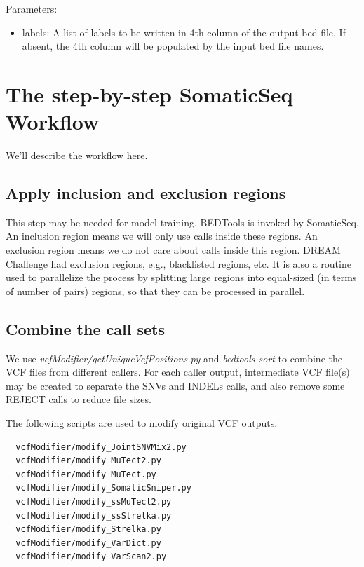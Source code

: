 \documentclass[10pt,letterpaper]{article}
\begin{document}
\begin{sloppypar}
\begin{lstlisting}
\end{lstlisting}

Parameters:

\begin{itemize}

\item labels: A list of labels to be written in 4th column of the output bed file. If absent, the 4th column will be populated by the input bed file names.

\end{itemize}




\section{The step-by-step SomaticSeq Workflow} \label{step_by_step_procedures}

We'll describe the workflow here.

\subsection{Apply inclusion and exclusion regions}

This step may be needed for model training. BEDTools is invoked by SomaticSeq. An inclusion region means we will only use calls inside these regions. An exclusion region means we do not care about calls inside this region. DREAM Challenge had exclusion regions, e.g., blacklisted regions, etc. It is also a routine used to parallelize the process by splitting large regions into equal-sized (in terms of number of pairs) regions, so that they can be processed in parallel.  



\subsection{Combine the call sets}
We use \textit{vcfModifier/getUniqueVcfPositions.py} and \textit{bedtools sort} to combine the VCF files from different callers. For each caller output, intermediate VCF file(s) may be created to separate the SNVs and INDELs calls, and also remove some REJECT calls to reduce file sizes.

The following scripts are used to modify original VCF outputs.


\begin{lstlisting}
  vcfModifier/modify_JointSNVMix2.py
  vcfModifier/modify_MuTect2.py
  vcfModifier/modify_MuTect.py
  vcfModifier/modify_SomaticSniper.py
  vcfModifier/modify_ssMuTect2.py
  vcfModifier/modify_ssStrelka.py
  vcfModifier/modify_Strelka.py
  vcfModifier/modify_VarDict.py
  vcfModifier/modify_VarScan2.py
\end{lstlisting}


\end{sloppypar}
\end{document}
